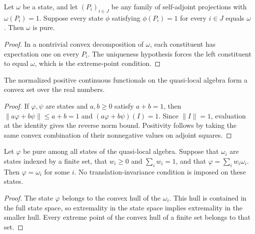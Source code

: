 \begin{lemma}
    \label{thm:qca_purity_of_supported_uniqueness}
    \leanok
    Let $\omega$ be a state, and let $(P_i)_{i\in J}$ be any family of
    self-adjoint projections with $\omega(P_i)=1$.
    Suppose every state $\phi$ satisfying $\phi(P_i)=1$ for every $i\in J$
    equals $\omega$. Then $\omega$ is pure.
\end{lemma}
\begin{proof}
    \leanok
    In a nontrivial convex decomposition of $\omega$, each constituent
    has expectation one on every $P_i$. The uniqueness hypothesis forces
    the left constituent to equal $\omega$, which is the extreme-point
    condition.
\end{proof}

\begin{lemma}
    \label{thm:quasi_local_state_space_convex}
    \leanok
    The normalized positive continuous functionals on the quasi-local algebra
    form a convex set over the real numbers.
\end{lemma}
\begin{proof}\leanok
    If $\varphi,\psi$ are states and $a,b\geq0$ satisfy $a+b=1$, then
    $\|a\varphi+b\psi\|\leq a+b=1$ and $(a\varphi+b\psi)(I)=1$.
    Since $\|I\|=1$, evaluation at the identity gives the reverse norm bound.
    Positivity follows by taking the same convex combination of their
    nonnegative values on adjoint squares.
\end{proof}

\begin{lemma}
    \label{thm:finite_pure_state_decomposition}
    \leanok
    Let $\varphi$ be pure among all states of the quasi-local algebra.
    Suppose that $\omega_i$ are states indexed by a finite set, that
    $w_i\geq0$ and $\sum_iw_i=1$, and that
    $\varphi=\sum_iw_i\omega_i$. Then $\varphi=\omega_i$ for some $i$.
    No translation-invariance condition is imposed on these states.
\end{lemma}
\begin{proof}\leanok
    The state $\varphi$ belongs to the convex hull of the $\omega_i$.
    This hull is contained in the full state space, so extremality in the
    state space implies extremality in the smaller hull. Every extreme
    point of the convex hull of a finite set belongs to that set.
\end{proof}

